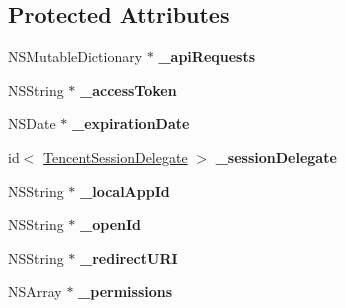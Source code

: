 \subsection*{Protected Attributes}
\begin{DoxyCompactItemize}
\item 
\mbox{\label{interface_tencent_o_auth_a7d41a812106258bb996b3c844ed3573b}} 
N\+S\+Mutable\+Dictionary $\ast$ {\bfseries \+\_\+api\+Requests}
\item 
\mbox{\label{interface_tencent_o_auth_a6027a0fb70d4625d896b738402be978e}} 
N\+S\+String $\ast$ {\bfseries \+\_\+access\+Token}
\item 
\mbox{\label{interface_tencent_o_auth_ac02f5959995675b211f5ec98f46d285f}} 
N\+S\+Date $\ast$ {\bfseries \+\_\+expiration\+Date}
\item 
\mbox{\label{interface_tencent_o_auth_ac12a69dda884bf4c0a85d2edc071a691}} 
id$<$ \mbox{\hyperlink{protocol_tencent_session_delegate-p}{Tencent\+Session\+Delegate}} $>$ {\bfseries \+\_\+session\+Delegate}
\item 
\mbox{\label{interface_tencent_o_auth_a6e950fb9a1b8c254c2feb53f0ca068ce}} 
N\+S\+String $\ast$ {\bfseries \+\_\+local\+App\+Id}
\item 
\mbox{\label{interface_tencent_o_auth_ab4d3c17610960cb4e2bf288f1c1ddce6}} 
N\+S\+String $\ast$ {\bfseries \+\_\+open\+Id}
\item 
\mbox{\label{interface_tencent_o_auth_a3538f163a1a937218456c956f606abbb}} 
N\+S\+String $\ast$ {\bfseries \+\_\+redirect\+U\+RI}
\item 
\mbox{\label{interface_tencent_o_auth_a62330e89b3b11e5bb839f522c36d4c27}} 
N\+S\+Array $\ast$ {\bfseries \+\_\+permissions}
\end{DoxyCompactItemize}
